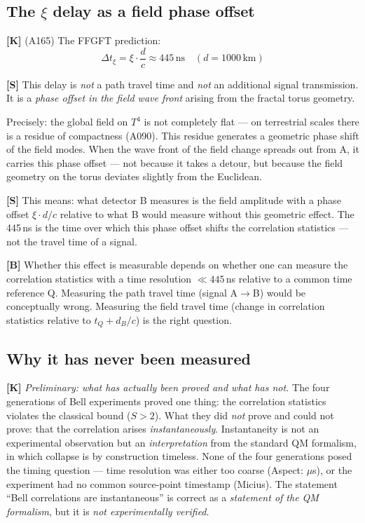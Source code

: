 \subsection{The $\xi$ delay as a field phase offset}

\textbf{[K]} (A165) The FFGFT prediction:
\[
  \Delta t_\xi = \xi \cdot \frac{d}{c} \approx 445\,\text{ns}
  \quad (d = 1000\,\text{km})
\]

\textbf{[S]} This delay is \emph{not} a path travel time and
\emph{not} an additional signal transmission. It is a \emph{phase
offset in the field wave front} arising from the fractal torus geometry.

Precisely: the global field on $T^4$ is not completely flat ---
on terrestrial scales there is a residue of compactness (A090). This
residue generates a geometric phase shift of the field modes. When the
wave front of the field change spreads out from A, it carries this
phase offset --- not because it takes a detour, but because the field
geometry on the torus deviates slightly from the Euclidean.

\textbf{[S]} This means: what detector B measures is the field amplitude
with a phase offset $\xi \cdot d/c$ relative to what B would measure
without this geometric effect. The 445\,ns is the time over which this
phase offset shifts the correlation statistics --- not the travel time
of a signal.

\textbf{[B]} Whether this effect is measurable depends on whether one
can measure the correlation statistics with a time resolution
$\ll 445$\,ns relative to a common time reference Q. Measuring the
path travel time (signal A$\to$B) would be conceptually wrong. Measuring
the field travel time (change in correlation statistics relative to
$t_Q + d_B/c$) is the right question.

\subsection{Why it has never been measured}

\textbf{[K]} \emph{Preliminary: what has actually been proved and what has not.}
The four generations of Bell experiments proved one thing: the correlation statistics violates the classical bound ($S > 2$). What they did \emph{not} prove and could not prove: that the correlation arises \emph{instantaneously}. Instantaneity is not an experimental observation but an \emph{interpretation} from the standard QM formalism, in which collapse is by construction timeless. None of the four generations posed the timing question --- time resolution was either too coarse (Aspect: $\mu$s), or the experiment had no common source-point timestamp (Micius). The statement \enquote{Bell correlations are instantaneous} is correct as a \emph{statement of the QM formalism}, but it is \emph{not experimentally verified}.

